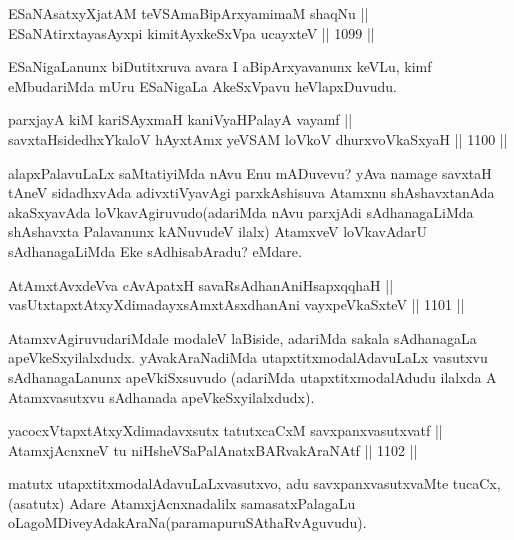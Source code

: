 \begin{shl}
ESaNAsatxyXjatAM teVSAmaBipArxyamimaM shaqNu ||  \\
ESaNAtirxtayasAyxpi kimitAyxkeSxVpa ucayxteV \hfill || 1099 ||  
\end{shl}

\begin{artha}
ESaNigaLanunx biDutitxruva avara I aBipArxyavanunx keVLu, kimf  eMbudariMda mUru ESaNigaLa AkeSxVpavu heVlapxDuvudu.
\end{artha}

\begin{shl}
parxjayA kiM kariSAyxmaH kaniVyaHPalayA vayamf || \\
savxtaHsidedhxYkaloV hAyxtAmx yeVSAM loVkoV dhurxvoV\s kaSxyaH \hfill || 1100 ||  
\end{shl}

\begin{artha}
alapxPalavuLaLx saMtatiyiMda nAvu Enu mADuvevu? yAva namage savxtaH tAneV sidadhxvAda adivxtiVyavAgi parxkAshisuva Atamxnu shAshavxtanAda akaSxyavAda loVkavAgiruvudo(adariMda nAvu parxjAdi sAdhanagaLiMda shAshavxta Palavanunx kANuvudeV ilalx) AtamxveV loVkavAdarU sAdhanagaLiMda Eke sAdhisabAradu? eMdare.
\end{artha}

\begin{shl}
AtAmxtAvxdeVva cAvApatxH savaRsAdhanAniHsapxqqhaH || \\
vasUtxtapxtAtxyXdimadayxsAmxtAsxdhanAni vayxpeVkaSxteV \hfill || 1101 ||  
\end{shl}

\begin{artha}
AtamxvAgiruvudariMdale modaleV laBiside, adariMda sakala sAdhanagaLa apeVkeSxyilalxdudx. yAvakAraNadiMda utapxtitxmodalAdavuLaLx vasutxvu sAdhanagaLanunx apeVkiSxsuvudo (adariMda utapxtitxmodalAdudu ilalxda A Atamxvasutxvu sAdhanada apeVkeSxyilalxdudx).
\end{artha}

\begin{shl}
yacocxVtapxtAtxyXdimadavxsutx tatutxcaCxM savxpanxvasutxvatf || \\
AtamxjAcnxneV tu niHsheVSaPalAnatxBARvakAraNAtf \hfill || 1102 ||  
\end{shl}

\begin{artha}
matutx utapxtitxmodalAdavuLaLxvasutxvo, adu savxpanxvasutxvaMte tucaCx, (asatutx) Adare AtamxjAcnxnadalilx samasatxPalagaLu oLagoMDiveyAdakAraNa(paramapuruSAthaRvAguvudu).
\end{artha}

